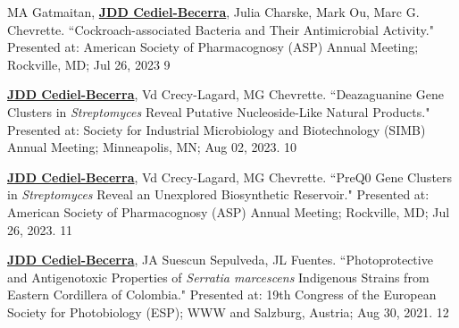 \begin{cvpubs}
\cvpub
{MA Gatmaitan, \textbf{\underline{JDD Cediel-Becerra}}, Julia Charske, Mark Ou, Marc G. Chevrette. ``Cockroach-associated Bacteria and Their Antimicrobial Activity." Presented at: American Society of Pharmacognosy (ASP) Annual Meeting; Rockville, MD; Jul 26, 2023}
{9}

\cvpub
{\textbf{\underline{JDD Cediel-Becerra}}, Vd Crecy-Lagard, MG Chevrette. ``Deazaguanine Gene Clusters in \textit{Streptomyces} Reveal Putative Nucleoside-Like Natural Products." Presented at: Society for Industrial Microbiology and Biotechnology (SIMB) Annual Meeting; Minneapolis, MN; Aug 02, 2023.}
{10}

\cvpub
{\textbf{\underline{JDD Cediel-Becerra}}, Vd Crecy-Lagard, MG Chevrette. ``PreQ0 Gene Clusters in \textit{Streptomyces} Reveal an Unexplored Biosynthetic Reservoir." Presented at: American Society of Pharmacognosy (ASP) Annual Meeting; Rockville, MD; Jul 26, 2023.}
{11}


\cvpub
{\textbf{\underline{JDD Cediel-Becerra}}, JA Suescun Sepulveda, JL Fuentes. ``Photoprotective and Antigenotoxic Properties of \textit{Serratia marcescens} Indigenous Strains from Eastern Cordillera of Colombia." Presented at: 19th Congress of the European Society for Photobiology (ESP); WWW and Salzburg, Austria; Aug 30, 2021.}
{12}

\end{cvpubs}
